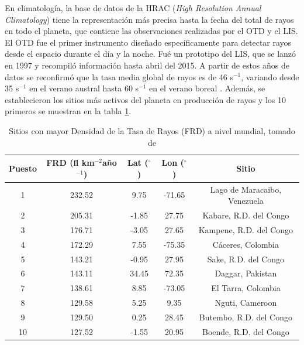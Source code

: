 \documentclass[11pt,oneside,openany,letter]{book}
\begin{document}
En climatología, la base de datos de la HRAC (\textit{High Resolution Annual Climatology}) \cite{AlbrechtEtal2016} tiene la representación más precisa hasta la fecha del total de rayos en todo el planeta, que contiene las observaciones realizadas por el OTD y el LIS. El OTD fue el primer instrumento diseñado específicamente para detectar rayos desde el espacio durante el día y la noche. Fu\'e un prototipo del LIS, que se lanzó en 1997 y recompiló información hasta abril del 2015. A partir de estos años de datos se reconfirmó que la tasa media global de rayos es de 46 s$^{-1}$, variando desde 35 s$^{-1}$ en el verano austral hasta 60 s$^{-1}$ en el verano boreal \cite{AlbrechtEtal2016}. Además, se establecieron los sitios más activos del planeta en producción de rayos y los 10 primeros se muestran en la tabla \ref{topten}.

\begin{table}[]
\caption{Sitios con mayor Densidad de la Tasa de Rayos (FRD) a nivel mundial, tomado de \cite{AlbrechtEtal2016}}
\label{topten}
\begin{tabular}{|c|c|c|c|c|}
\hline
\textbf{Puesto} & \textbf{FRD (fl km$^{-2}$año$^{-1}$)} & \textbf{Lat ($^{\circ}$)} & \textbf{Lon ($^{\circ}$)} & \textbf{Sitio}               \\ \hline
1                       & 232.52       & 9.75             & -71.65            & Lago de Maracaibo, Venezuela \\ \hline
2                       & 205.31       & -1.85            & 27.75             & Kabare, R.D. del Congo       \\ \hline
3                       & 176.71       & -3.05            & 27.65             & Kampene, R.D. del Congo      \\ \hline
4                       & 172.29       & 7.55             & -75.35            & Cáceres, Colombia            \\ \hline
5                       & 143.21       & -0.95            & 27.95             & Sake, R.D. del Congo         \\ \hline
6                       & 143.11       & 34.45            & 72.35             & Daggar, Pakistan             \\ \hline
7                       & 138.61       & 8.85             & -73.05            & El Tarra, Colombia           \\ \hline
8                       & 129.58       & 5.25             & 9.35              & Nguti, Cameroon              \\ \hline
9                       & 129.50       & 0.25             & 28.45             & Butembo, R.D. del Congo      \\ \hline
10                      & 127.52       & -1.55            & 20.95             & Boende, R.D. del Congo       \\ \hline
\end{tabular}
\end{table}
\end{document}
